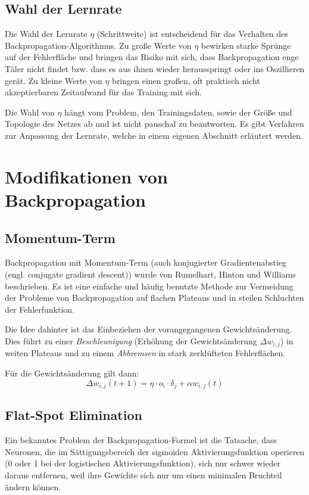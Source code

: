 \subsection*{Wahl der Lernrate}
Die Wahl der Lernrate $\eta$ (Schrittweite) ist entscheidend für das Verhalten des Backpropagation-Algorithmus. Zu große Werte von $\eta$ bewirken starke Sprünge auf der Fehlerfläche und bringen das Risiko mit sich, dass Backpropagation enge Täler nicht findet bzw. dass es aus ihnen wieder herausspringt oder ins Oszillieren gerät.
Zu kleine Werte von $\eta$ bringen einen großen, oft praktisch nicht akzeptierbaren Zeitaufwand für das Training mit sich.

Die Wahl von $\eta$ hängt vom Problem, den Trainingsdaten, sowie der Größe und Topologie des Netzes ab und ist nicht pauschal zu beantworten. Es gibt Verfahren zur Anpassung der Lernrate, welche in einem eigenen Abschnitt erläutert werden.



\section*{Modifikationen von Backpropagation}
\subsection*{Momentum-Term}
Backpropagation mit Momentum-Term (auch konjugierter Gradientenabstieg (engl. conjugate gradient descent)) wurde von Rumelhart, Hinton und Williams beschrieben.
Es ist eine einfache und häufig benutzte Methode zur Vermeidung der Probleme von Backpropagation auf flachen Plateaus und in steilen Schluchten der Fehlerfunktion. 

Die Idee dahinter ist das Einbeziehen der vorangegangenen Gewichtsänderung. Dies führt zu einer \emph{Beschleunigung} (Erhöhung der Gewichtsänderung $\Delta w_{i,j}$) in weiten Plateaus und zu einem \emph{Abbremsen} in stark zerklüfteten Fehlerflächen.

Für die Gewichtsänderung gilt dann:
\[
	\Delta w_{i,j} (t+1) = \eta \cdot o_i \cdot \delta_j + 
		\alpha w_{i,j}(t)
\]

\subsection*{Flat-Spot Elimination}
Ein bekanntes Problem der Backpropagation-Formel ist die Tatsache, dass Neuronen, die im Sättigungsbereich der sigmoiden Aktivierungsfunktion operieren (0 oder 1 bei der logistischen Aktivierungsfunktion), sich nur schwer wieder daraus entfernen, weil ihre Gewichte sich nur um einen minimalen Bruchteil ändern können.

